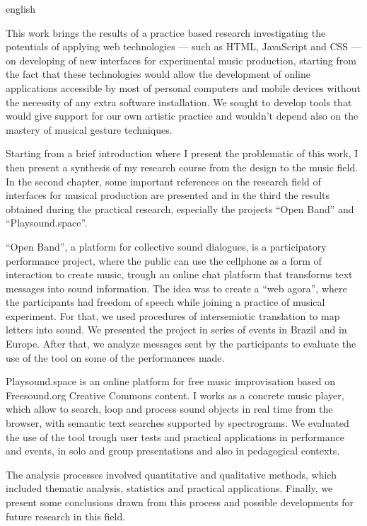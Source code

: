 \documentclass[
	12pt,				%
	openright,			%
	twoside,			%
	a4paper,			%
	english,			%
	french,				%
	spanish,			%
	brazil				%
	]{abntex2}
\begin{document}
\begin{resumo}[Abstract]
\begin{otherlanguage*}{english}

This work brings the results of a practice based research investigating the potentials of applying web technologies --- such as HTML, JavaScript and CSS --- on developing of new interfaces for experimental music production, starting from the fact that these technologies would allow the development of online applications accessible by most of personal computers and mobile devices without the necessity of any extra software installation. We sought to develop tools that would give support for our own artistic practice and wouldn't depend also on the mastery of musical gesture techniques.

Starting from a brief introduction where I present the problematic of this work, I then present a synthesis of my research course from the design to the music field. In the second chapter, some important references on the research field of interfaces for musical production are presented and in the third the results obtained during the practical research, especially the projects ``Open Band'' and ``Playsound.space''.

``Open Band'', a platform for collective sound dialogues, is a participatory performance project, where the public can use the cellphone as a form of interaction to create music, trough an online chat platform that transforms text messages into sound information. The idea was to create a ``web agora'', where the participants had freedom of speech while joining a practice of musical experiment. For that, we used procedures of intersemiotic translation to map letters into sound. We presented the project in series of events in Brazil and in Europe. After that, we analyze messages sent by the participants to evaluate the use of the tool on some of the performances made.

Playsound.space is an online platform for free music improvisation based on Freesound.org Creative Commons content. I works as a concrete music player, which allow to search, loop and process sound objects in real time from the browser, with semantic text searches supported by spectrograms. We evaluated the use of the tool trough user tests and practical applications in performance and events, in solo and group presentations and also in pedagogical contexts. 

The analysis processes involved quantitative and qualitative methods, which included thematic analysis, statistics and practical applications. Finally, we present some conclusions drawn from this process and possible developments for future research in this field.








\end{otherlanguage*}
\end{resumo}
\end{document}
